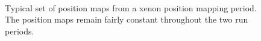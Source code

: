 \begin{figure}[hp] 
\centering
{} \\
\caption{Typical set of position maps from a xenon position mapping period. The position maps
  remain fairly constant throughout the two run periods.}
\label{fig:posmaps}
\end{figure}


